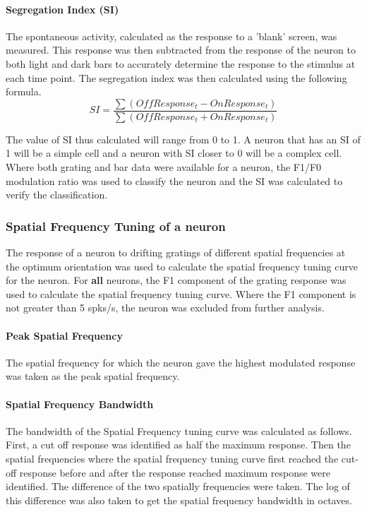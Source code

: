 					\paragraph{Segregation Index (SI)}
					
					The spontaneous activity, calculated as the response to a 'blank' screen, was measured. This response was then subtracted from the response of the neuron to both light and dark bars to accurately determine the response to the stimulus at each time point. The segregation index was then calculated using the following formula.
					\[SI= \frac{\sum(Off Response_t- On Response_t)}{\sum(Off Response_t+ On Response_t)}\]
					
					
					The value of SI thus calculated will range from 0 to 1. A neuron that has an SI of 1 will be a simple cell and a neuron with SI closer to 0 will be a complex cell. Where both grating and bar data were available for a neuron, the F1/F0 modulation ratio was used to classify the neuron and the SI was calculated to verify the classification.
					
				\subsubsection{Spatial Frequency Tuning of a neuron}
					
					The response of a neuron to drifting gratings of different spatial frequencies at the optimum orientation was used to calculate the spatial frequency tuning curve for the neuron. For \textbf{all} neurons, the F1 component of the grating response was used to calculate the spatial frequency tuning curve. Where the F1 component is not greater than 5 spks/s, the neuron was excluded from further analysis.
					
					\paragraph{Peak Spatial Frequency}
					
					The spatial frequency for which the neuron gave the highest modulated response was taken as the peak spatial frequency.
					
					\paragraph{Spatial Frequency Bandwidth}
					
					The bandwidth of the Spatial Frequency tuning curve was calculated as follows. First, a cut off response was identified as half the maximum response. Then the spatial frequencies where the spatial frequency tuning curve first reached the cut-off response before and after the response reached maximum response were identified. The difference of the two spatially frequencies were taken. The log of this difference was also taken to get the spatial frequency bandwidth in octaves.
					
